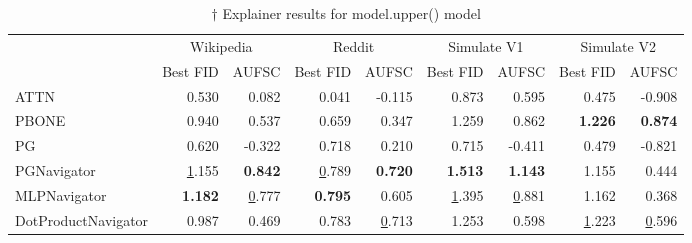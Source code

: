 \begin{table}
\caption{$\dagger$ Explainer results for {model.upper()} model}
\label{tab:tgat_results}
\begin{tabular}{lrrrrrrrr}
\toprule
 & \multicolumn{2}{c}{Wikipedia} & \multicolumn{2}{c}{Reddit} & \multicolumn{2}{c}{Simulate V1} & \multicolumn{2}{c}{Simulate V2} \\
 & Best FID & AUFSC & Best FID & AUFSC & Best FID & AUFSC & Best FID & AUFSC \\
\midrule
ATTN & 0.530 & 0.082 & 0.041 & -0.115 & 0.873 & 0.595 & 0.475 & -0.908 \\
PBONE & 0.940 & 0.537 & 0.659 & 0.347 & 1.259 & 0.862 & \bfseries 1.226 & \bfseries 0.874 \\
PG & 0.620 & -0.322 & 0.718 & 0.210 & 0.715 & -0.411 & 0.479 & -0.821 \\
PGNavigator & \underline 1.155 & \bfseries 0.842 & \underline 0.789 & \bfseries 0.720 & \bfseries 1.513 & \bfseries 1.143 & 1.155 & 0.444 \\
MLPNavigator & \bfseries 1.182 & \underline 0.777 & \bfseries 0.795 & 0.605 & \underline 1.395 & \underline 0.881 & 1.162 & 0.368 \\
DotProductNavigator & 0.987 & 0.469 & 0.783 & \underline 0.713 & 1.253 & 0.598 & \underline 1.223 & \underline 0.596 \\
\bottomrule
\end{tabular}
\end{table}
